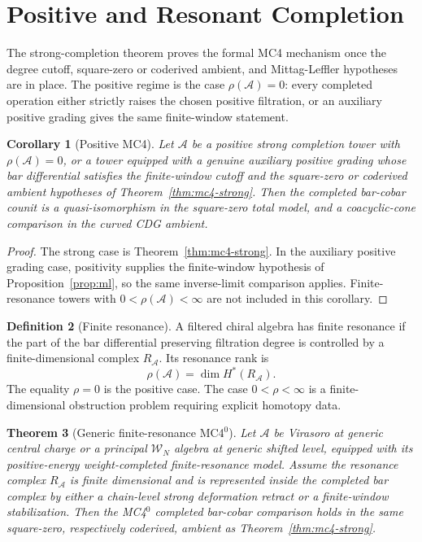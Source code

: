 \documentclass[11pt,reqno]{amsart}
\newtheorem{theorem}{Theorem}[section]
\newtheorem{corollary}[theorem]{Corollary}
\theoremstyle{definition}
\newtheorem{definition}[theorem]{Definition}
\theoremstyle{remark}
\newcommand{\cA}{\mathcal{A}}
\newcommand{\cW}{\mathcal{W}}
\numberwithin{equation}{section}
\begin{document}

\section{Positive and Resonant Completion}
\label{sec:mc4}

The strong-completion theorem proves the formal MC4 mechanism once
the degree cutoff, square-zero or coderived ambient, and
Mittag-Leffler hypotheses are in place. The positive regime is the
case $\rho(\cA)=0$: every completed operation either strictly
raises the chosen positive filtration, or an auxiliary positive
grading gives the same finite-window statement.

\begin{corollary}[Positive MC4]
\label{cor:mc4-plus}
Let $\cA$ be a positive strong completion tower with
$\rho(\cA)=0$, or a tower equipped with a genuine auxiliary
positive grading whose bar differential satisfies the finite-window
cutoff and the square-zero or coderived ambient hypotheses of
Theorem~\ref{thm:mc4-strong}. Then the completed bar-cobar counit
is a quasi-isomorphism in the square-zero total model, and a
coacyclic-cone comparison in the curved CDG ambient.
\end{corollary}

\begin{proof}
The strong case is Theorem~\ref{thm:mc4-strong}. In the auxiliary
positive grading case, positivity supplies the finite-window
hypothesis of Proposition~\ref{prop:ml}, so the same inverse-limit
comparison applies. Finite-resonance towers with
$0<\rho(\cA)<\infty$ are not included in this corollary.
\end{proof}

\begin{definition}[Finite resonance]
\label{def:finite-resonance}
A filtered chiral algebra has finite resonance if the part of the
bar differential preserving filtration degree is controlled by a
finite-dimensional complex $R_\cA$. Its resonance rank is
\[
\rho(\cA)=\dim H^*(R_\cA).
\]
The equality $\rho=0$ is the positive case. The case
$0<\rho<\infty$ is a finite-dimensional obstruction problem
requiring explicit homotopy data.
\end{definition}

\begin{theorem}[Generic finite-resonance MC4${}^0$]
\label{thm:n4-mc4-zero-generic-parameters}
Let $\cA$ be Virasoro at generic central charge or a principal
$\cW_N$ algebra at generic shifted level, equipped with its
positive-energy weight-completed finite-resonance model. Assume the
resonance complex $R_\cA$ is finite dimensional and is represented
inside the completed bar complex by either a chain-level strong
deformation retract or a finite-window stabilization. Then the
MC4${}^0$ completed bar-cobar comparison holds in the same
square-zero, respectively coderived, ambient as
Theorem~\ref{thm:mc4-strong}.
\end{theorem}
\end{document}
